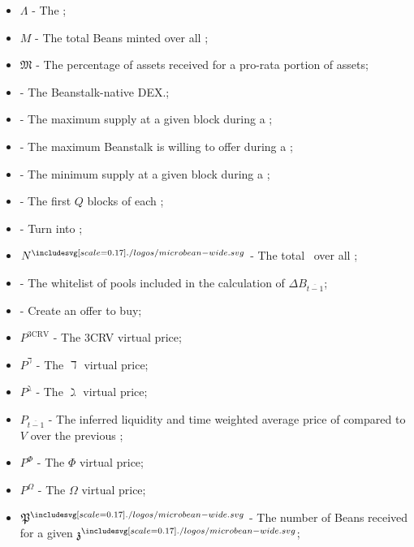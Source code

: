 \documentclass[class=article, crop=false]{standalone}
\begin{document}
\begin{itemize}[topsep=0pt, itemsep=3pt,leftmargin=16pt]
    \item[] $\Lambda$ - \hypertarget{ht127}{The };
    \item[] $M$ - \hypertarget{ht128}{The total Beans minted over all };
    \item[] $\mathfrak{M}$ - \hypertarget{ht129}{The percentage of  assets received for  a pro-rata portion of  assets};
    \item[]  - \hypertarget{ht130}{The Beanstalk-native DEX.};
    \item[]  - The maximum  supply at a given block during a ;
    \item[]  - The maximum  Beanstalk is willing to offer during a ;
    \item[]  - The minimum  supply at a given block during a ;
    \item[]  - The first $Q$ blocks of each ;
    \item[]  - \hypertarget{ht131}{Turn  into };
    \item[] $N^{\bean}$ - \hypertarget{ht132}{The total  \Bean\ over all };
    \item[]  - \hypertarget{ht133}{The whitelist of pools included in the calculation of $\Delta B_{\overline{t-1}}$};
    \item[]  - \hypertarget{ht134}{Create an offer to buy};
    \item[] $P^{\text{3CRV}}$ - \hypertarget{ht136}{The 3CRV virtual price};
    \item[] $P^{\daleth}$ - \hypertarget{ht137}{The $\daleth$ virtual price};
    \item[] $P^{\gimel}$ - \hypertarget{ht138}{The $\gimel$ virtual price};
    \item[] $P_{\overline{t-1}}$ - \hypertarget{ht139}{The inferred liquidity and time weighted average price of  compared to $V$ over the previous };
    \item[] $P^{\Phi}$ - \hypertarget{ht140}{The $\Phi$ virtual price};
    \item[] $P^{\Omega}$ - \hypertarget{ht141}{The $\Omega$ virtual price};
    \item[] $\mathfrak{P}^{\bean}$ - \hypertarget{ht142}{The number of Beans received for  a given $\mathfrak{z}^{\bean}$};

\end{itemize}
\end{document}
